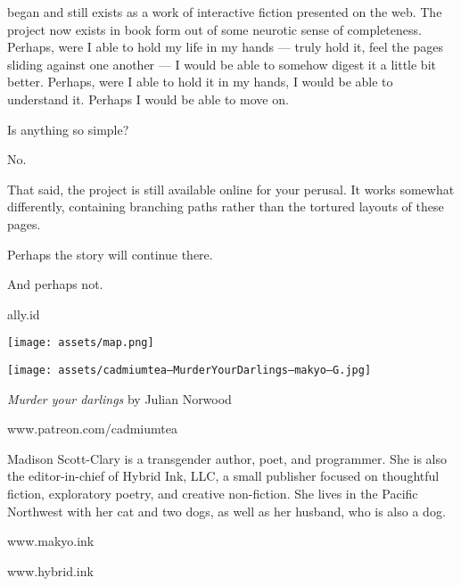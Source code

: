 \label{afterword}
\begin{paracol}{2}
\begin{leftcolumn}
   began and still exists as a work of interactive fiction presented on the web. The project now exists in book form out of some neurotic sense of completeness. Perhaps, were I able to hold my life in my hands --- truly hold it, feel the pages sliding against one another --- I would be able to somehow digest it a little bit better. Perhaps, were I able to hold it in my hands, I would be able to understand it. Perhaps I would be able to move on.

  \begin{ally}
    Is anything so simple?
  \end{ally}
  No.

  That said, the project is still available online for your perusal. It works somewhat differently, containing branching paths rather than the tortured layouts of these pages.

  Perhaps the story will continue there.

  \begin{ally}
    And perhaps not.
  \end{ally}
  \vfill
  \begin{center}
    {\allyFont ally.id}
  \end{center}
  \vfill
\end{leftcolumn}
\begin{rightcolumn}
  \texttt{[image: assets/map.png]}
\end{rightcolumn}
\end{paracol}
\newpage

\begin{paracol}{2}
\begin{leftcolumn}
\texttt{[image: assets/cadmiumtea--MurderYourDarlings--makyo--G.jpg]}

\emph{Murder your darlings} by Julian Norwood

www.patreon.com/cadmiumtea
\end{leftcolumn}
\begin{rightcolumn}
    \null
    \vfill
\noindent Madison Scott-Clary is a transgender author, poet, and programmer. She is also the editor-in-chief of Hybrid Ink, LLC, a small publisher focused on thoughtful fiction, exploratory poetry, and creative non-fiction. She lives in the Pacific Northwest with her cat and two dogs, as well as her husband, who is also a dog.


\begin{center}
    www.makyo.ink

    www.hybrid.ink
\end{center}
\vfill
\end{rightcolumn}
\end{paracol}

